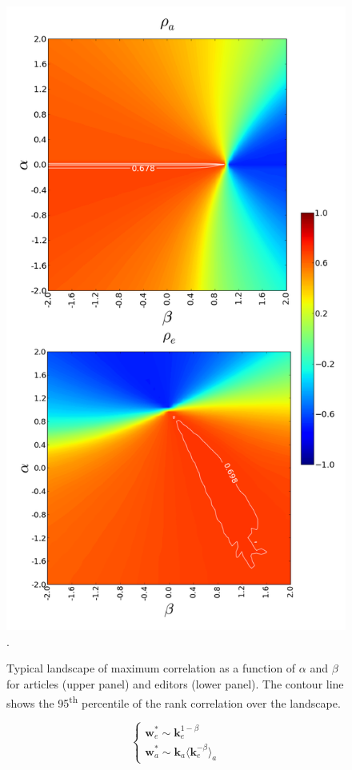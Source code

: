 \begin{figure}[!t]
\centering
\includegraphics[width=0.9\columnwidth]{Figures/contour_fem_combined.png}.
\caption{Typical landscape of maximum correlation as a function of $\alpha$ and $\beta$ for articles (upper panel) and editors (lower panel). The contour line shows the 95\textsuperscript{th} percentile of the rank correlation over the landscape.}
\label{fig:landscape}
\end{figure}


\begin{equation}
\begin{cases}
\mathbf{w}_e^* \sim \mathbf{k}_e^{1-\beta}\\
\mathbf{w}_a^* \sim \mathbf{k}_a \langle \mathbf{k}_e^{-\beta}\rangle_a
\end{cases}
\end{equation}

